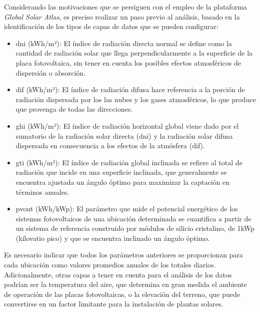 \vspace{3mm}

Considerando las motivaciones que se persiguen con el empleo de la plataforma \textit{Global Solar Atlas}, es preciso realizar un paso previo al análisis, basado en la identificación de los tipos de capas de datos que se pueden configurar: \cite{globalsolarreport}

\begin{itemize}    
    \item \gls{dni} (kWh/m²): El índice de radiación directa normal se define como la cantidad de radiación solar que llega perpendicularmente a la superficie de la placa fotovoltaica, sin tener en cuenta los posibles efectos atmosféricos de dispersión o absorción.
    \item \gls{dif} (kWh/m²): El índice de radiación difusa hace referencia a la porción de radiación dispersada por los las nubes y los gases atmosféricos, lo que produce que provenga de todas las direcciones.
    \item \gls{ghi} (kWh/m²): El índice de radiación horizontal global viene dado por el sumatorio de la radiación solar directa (\gls{dni}) y la radiación solar difusa dispersada en consecuencia a los efectos de la atmósfera (\gls{dif}).
    \item \gls{gti} (kWh/m²): El índice de radiación global inclinada se refiere al total de radiación que incide en una superficie inclinada, que generalmente se encuentra ajustada un ángulo óptimo para maximizar la captación en términos anuales. 
    \item \gls{pvout} (kWh/kWp): El parámetro que mide el potencial energético de los sistemas fotovoltaicos de una ubicación determinada se cuantifica a partir de un sistema de referencia construido por módulos de silicio cristalino, de 1kWp (kilovatio pico) y que se encuentra inclinado un ángulo óptimo.
\end{itemize}

Es necesario indicar que todos los parámetros anteriores se proporcionan para cada ubicación como valores promedios anuales de los totales diarios. Adicionalmente, otras capas a tener en cuenta para el análisis de los datos podrían ser la temperatura del aire, que determina en gran medida el ambiente de operación de las placas fotovoltaicas, o la elevación del terreno, que puede convertirse en un factor limitante para la instalación de plantas solares. 

\vspace{3mm}

